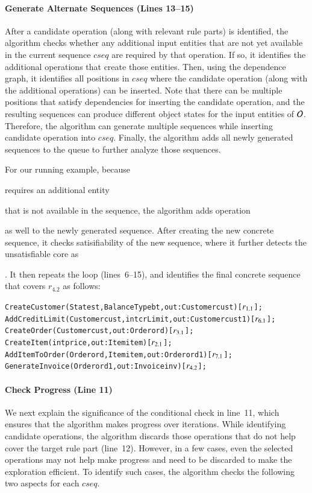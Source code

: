 
\vskip -7pt
\paragraph*{Generate Alternate Sequences (Lines 13--15)} After a candidate
operation (along with relevant rule parts) is identified, the algorithm checks
whether any additional input entities that are not yet available in the current
sequence $cseq$ are required by that operation.  If so, it identifies the
additional operations that create those entities. Then, using the dependence
graph, it identifies all positions in $cseq$ where the candidate operation
(along with the additional operations) can be inserted. Note that there can be
multiple positions that satisfy dependencies for inserting the candidate
operation, and the resulting sequences can produce different object states for
the input entities of ${\cal O}$.  Therefore, the algorithm can generate
multiple sequences while inserting candidate operation into $cseq$. Finally, the
algorithm adds all newly generated sequences to the queue to further analyze
those sequences.

For our running example, because \subject{AddItemToOrder} requires an additional
entity \subject{Item} that is not available in the sequence, the algorithm adds
operation \subject{CreateItem} as well to the newly generated sequence. After
creating the new concrete sequence, it checks satisifiability of the new
sequence, where it further detects the unsatisfiable core as
\subject{cust.crLimit = 0 $\wedge$ cust.crLimit > 0}.  It then repeats the loop
(lines~6--15), and identifies the final concrete sequence that covers $r_{4.2}$
as follows:

\vspace*{-4pt}
{\scriptsize
\begin{alltt}
 CreateCustomer(State st, BalanceType bt, out: Customer cust) [\(r\sb{1.1}\)];
 AddCreditLimit(Customer cust, int crLimit, out: Customer cust1) [\(r\sb{6.1}\)];
 CreateOrder(Customer cust, out: Order ord) [\(r\sb{3.1}\)];
 CreateItem(int price, out: Item item) [\(r\sb{2.1}\)];
 AddItemToOrder(Order ord, Item item, out: Order ord1) [\(r\sb{7.1}\)];
 GenerateInvoice(Order ord1, out: Invoice inv) [\(r\sb{4.2}\)];  
\end{alltt}
}
\vspace*{-5pt}

\vskip -7pt
\paragraph*{Check Progress (Line 11)} We next explain the significance of the
conditional check in line~11, which ensures that the algorithm makes progress
over iterations.  While identifying candidate operations, the algorithm discards
those operations that do not help cover the target rule part (line~12). However,
in a few cases, even the selected operations may not help make progress and need
to be discarded to make the exploration efficient. To identify such cases, the
algorithm checks the following two aspects for each $cseq$.

